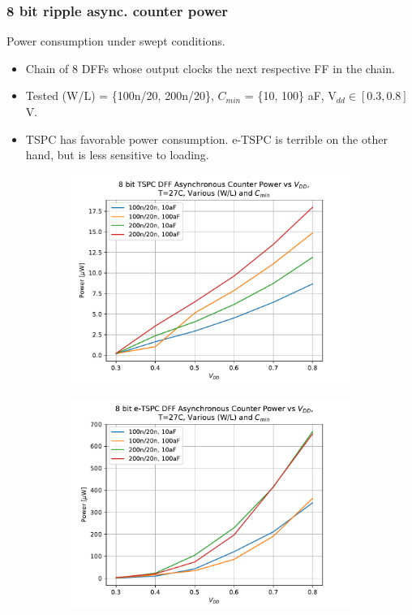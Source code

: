 \documentclass[t, screen, aspectratio=43]{beamer}
\begin{document}
\begin{frame}
	\frametitle{8 bit ripple async. counter power}
	\begin{block}{Power consumption under swept conditions.}
	\tiny
	\begin{itemize}[itemsep=4pt,label=\protect---]
		\item Chain of 8 DFFs whose output clocks the next respective FF in the chain.
		\item Tested (W/L) = \{100n/20, 200n/20\}, $C_{min}$ = \{10, 100\} aF, V$_{dd} \in [0.3, 0.8]$ V. 
		\item TSPC has favorable power consumption. e-TSPC is terrible on the other hand, but is less sensitive to loading.

	\end{itemize}
	\begin{figure}[htb!]
	    \centering
	    \begin{subfigure}{0.5\textwidth}
	        \centering
	        \includegraphics[width=1\textwidth, angle=0]{tspc_counter_power.pdf}
	    \end{subfigure}%
	    \begin{subfigure}{0.5\textwidth}
	        \centering
	        \center\includegraphics[width=1.0\textwidth, angle=0]{etspc_counter_power.pdf}

\end{subfigure}
\end{figure}
\end{block}
\end{frame}
\end{document}
